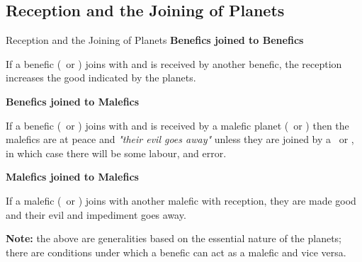 \subsection{Reception and the Joining of Planets}
\begin{frame}[t]{Reception and the Joining of Planets}
\textbf{Benefics joined to Benefics}

If a benefic (\Venus\ or \Jupiter) joins with and is received by another benefic, the reception increases the good indicated by the planets.

\textbf{Benefics joined to Malefics}

If a benefic (\Venus\ or \Jupiter) joins with and is received by a malefic planet (\Mars\ or \Saturn) then the malefics are at peace and \textsl{"their evil goes away"} unless they are joined by a \Square\ or \Opposition, in which case there will be some labour, and error.

\textbf{Malefics joined to Malefics}

If a malefic (\Mars\ or \Saturn) joins with another malefic with reception, they are made good and their evil and impediment goes away.
\vspace{0.5cm}

\begin{mdframed}[backgroundcolor=gray!5, rightmargin=2em, leftmargin=2em]
\textbf{Note:} the above are generalities based on the essential nature of the planets; there are conditions under which a benefic can act as a malefic and vice versa.
\end{mdframed}

\end{frame}
